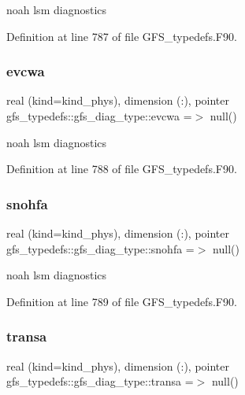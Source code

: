 noah lsm diagnostics 



Definition at line 787 of file G\+F\+S\+\_\+typedefs.\+F90.

\mbox{\label{structgfs__typedefs_1_1gfs__diag__type_adda851f4e824c2d6a8f8a650a7d9ef96}} 
\subsubsection{evcwa}
{\footnotesize\ttfamily real (kind=kind\+\_\+phys), dimension  (\+:), pointer gfs\+\_\+typedefs\+::gfs\+\_\+diag\+\_\+type\+::evcwa =$>$ null()}



noah lsm diagnostics 



Definition at line 788 of file G\+F\+S\+\_\+typedefs.\+F90.

\mbox{\label{structgfs__typedefs_1_1gfs__diag__type_a82e7de56f63add72c4353f7108bd8fd8}} 
\subsubsection{snohfa}
{\footnotesize\ttfamily real (kind=kind\+\_\+phys), dimension (\+:), pointer gfs\+\_\+typedefs\+::gfs\+\_\+diag\+\_\+type\+::snohfa =$>$ null()}



noah lsm diagnostics 



Definition at line 789 of file G\+F\+S\+\_\+typedefs.\+F90.

\mbox{\label{structgfs__typedefs_1_1gfs__diag__type_a590eaf92c6c5fcaf6b8a2c8f1580102c}} 
\subsubsection{transa}
{\footnotesize\ttfamily real (kind=kind\+\_\+phys), dimension (\+:), pointer gfs\+\_\+typedefs\+::gfs\+\_\+diag\+\_\+type\+::transa =$>$ null()}




